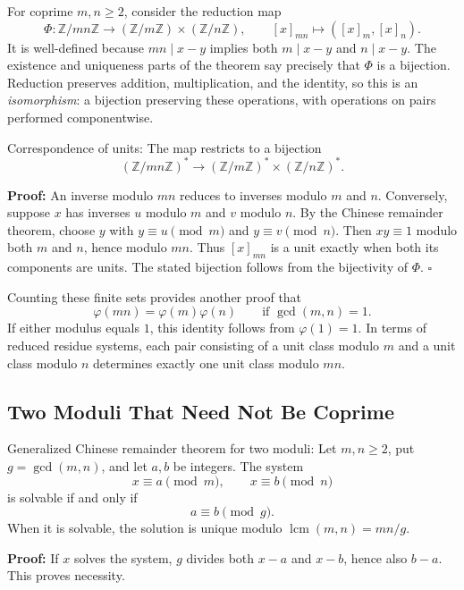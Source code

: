 \documentclass[a4paper,11pt,abstracton]{scrartcl}
\theoremstyle{dotlessP}
\theoremstyle{dotlessS}
\theoremstyle{remark}
\theoremstyle{definition}
\begin{document}
For coprime $m,n\geq2$, consider the reduction map
\[
    \Phi:\mathbb{Z}/mn\mathbb{Z}
    \longrightarrow(\mathbb{Z}/m\mathbb{Z})\times(\mathbb{Z}/n\mathbb{Z}),
    \qquad [x]_{mn}\longmapsto([x]_m,[x]_n).
\]
It is well-defined because $mn\mid x-y$ implies both $m\mid x-y$
and $n\mid x-y$. The existence and uniqueness parts of the theorem
say precisely that $\Phi$ is a bijection. Reduction preserves addition,
multiplication, and the identity, so this is an \emph{isomorphism}:
a bijection preserving these operations, with operations on pairs
performed componentwise.

\begin{mainbox}{Correspondence of units:}
The map restricts to a bijection
\[
    (\mathbb{Z}/mn\mathbb{Z})^*
    \longrightarrow(\mathbb{Z}/m\mathbb{Z})^*
                     \times(\mathbb{Z}/n\mathbb{Z})^*.
\]
\end{mainbox}

\textbf{Proof:}
An inverse modulo $mn$ reduces to inverses modulo $m$ and $n$.
Conversely, suppose $x$ has inverses $u$ modulo $m$ and $v$ modulo $n$.
By the Chinese remainder theorem, choose $y$ with
$y\equiv u\pmod m$ and $y\equiv v\pmod n$.
Then $xy\equiv1$ modulo both $m$ and $n$, hence modulo $mn$.
Thus $[x]_{mn}$ is a unit exactly when both its components are units.
The stated bijection follows from the bijectivity of $\Phi$.
\hfill$\square$


Counting these finite sets provides another proof that
\[
    \varphi(mn)=\varphi(m)\varphi(n)\qquad\text{if }\gcd(m,n)=1.
\]
If either modulus equals $1$, this identity follows from $\varphi(1)=1$.
In terms of reduced residue systems, each pair consisting of a unit
class modulo $m$ and a unit class modulo $n$ determines exactly one
unit class modulo $mn$.

\subsection{Two Moduli That Need Not Be Coprime}

\begin{mainbox}{Generalized Chinese remainder theorem for two moduli:}
Let $m,n\geq2$, put $g=\gcd(m,n)$, and let $a,b$ be integers.
The system
\[
    x\equiv a\pmod m,\qquad x\equiv b\pmod n
\]
is solvable if and only if
\[
    a\equiv b\pmod g.
\]
When it is solvable, the solution is unique modulo
$\operatorname{lcm}(m,n)=mn/g$.
\end{mainbox}

\textbf{Proof:}
If $x$ solves the system, $g$ divides both $x-a$ and $x-b$, hence
also $b-a$. This proves necessity.
\end{document}
